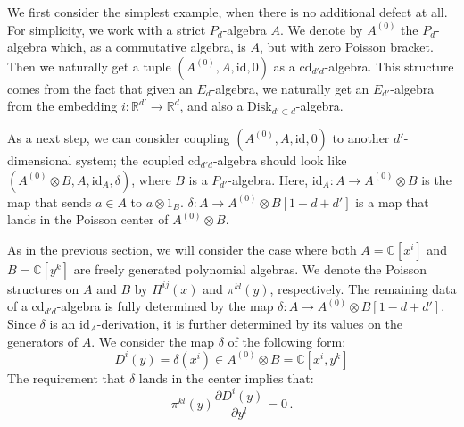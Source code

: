 \documentclass[11pt]{article}
\newcommand{\C}{\mathbb{C}}
\newcommand{\R}{\mathbb{R}}
\numberwithin{equation}{section}
\begin{document}
We first consider the simplest example, when there is no additional defect at all. For simplicity, we work with a strict $P_d$-algebra $A$. We denote by $A^{(0)}$ the $P_d$-algebra which, as a commutative algebra, is $A$, but with zero Poisson bracket. Then we naturally get a tuple $(A^{(0)},A,\mathrm{id},0)$ as a $\mathrm{cd}_{d'd}$-algebra. This structure comes from the fact that given an $E_d$-algebra, we naturally get an $E_{d'}$-algebra from the embedding $i: \R^{d'} \to \R^d$, and also a $\mathrm{Disk}_{d'\subset d}$-algebra. 

As a next step, we can consider coupling $(A^{(0)},A,\mathrm{id},0)$ to another $d'$-dimensional system; the coupled $\mathrm{cd}_{d'd}$-algebra should look like $(A^{(0)}\otimes B, A,\mathrm{id}_{A},\delta)$, where $B$ is a $P_{d'}$-algebra. Here, $\mathrm{id}_{A}:A \to A^{(0)}\otimes B$ is the map that sends $a \in A$ to $a\otimes 1_B$. $\delta: A \to A^{(0)}\otimes B[1-d+d']$ is a map that lands in the Poisson center of $A^{(0)}\otimes B$.

As in the previous section, we will consider the case where both $A = \C[x^i]$ and $B = \C[y^k]$ are freely generated polynomial algebras. We denote the Poisson structures on $A$ and $B$ by $\Pi^{ij}(x)$ and $\pi^{kl}(y)$, respectively. The remaining data of a $\mathrm{cd}_{d'd}$-algebra is fully determined by the map $\delta: A \to A^{(0)}\otimes B[1-d+d']$. Since $\delta$ is an $\mathrm{id}_A$-derivation, it is further determined by its values on the generators of $A$. We consider the map $\delta$ of the following form:
\begin{equation}
	D^i(y) = \delta(x^i) \in A^{(0)}\otimes B = \C[x^i,y^k]
\end{equation}
The requirement that $\delta$ lands in the center implies that:
\begin{equation}\label{eq:defect_center}
	\pi^{kl}(y)\frac{\partial D^{i}(y)}{\partial y^l} = 0\,.
\end{equation}
\end{document}
